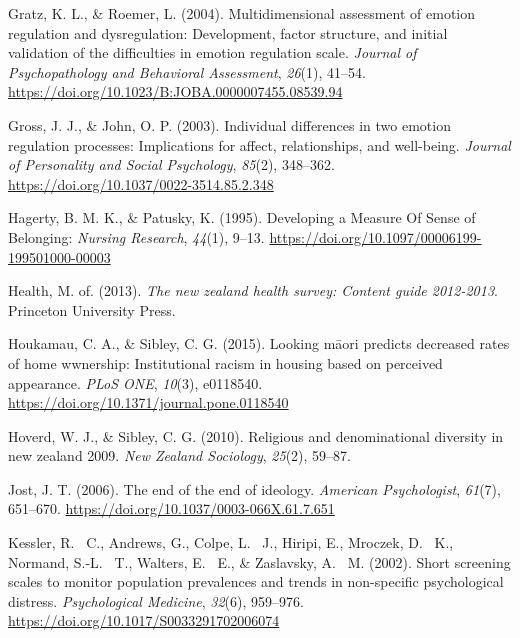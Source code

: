 \documentclass[
  letterpaper,
  DIV=11,
  numbers=noendperiod]{scrartcl}
\newlength{\cslhangindent}
\newlength{\cslentryspacingunit} %
\newenvironment{CSLReferences}[2] %
 {%
  \setlength{\parindent}{0pt}
  \ifodd #1
  \let\oldpar\par
  \def\par{\hangindent=\cslhangindent\oldpar}
  \fi
  \setlength{\parskip}{#2\cslentryspacingunit}
 }%
 {}
\begin{document}
\begin{CSLReferences}{1}{0}
\leavevmode{}%
Gratz, K. L., \& Roemer, L. (2004). Multidimensional assessment of
emotion regulation and dysregulation: Development, factor structure, and
initial validation of the difficulties in emotion regulation scale.
\emph{Journal of Psychopathology and Behavioral Assessment},
\emph{26}(1), 41--54.
\url{https://doi.org/10.1023/B:JOBA.0000007455.08539.94}

\leavevmode{}%
Gross, J. J., \& John, O. P. (2003). Individual differences in two
emotion regulation processes: Implications for affect, relationships,
and well-being. \emph{Journal of Personality and Social Psychology},
\emph{85}(2), 348--362. \url{https://doi.org/10.1037/0022-3514.85.2.348}

\leavevmode{}%
Hagerty, B. M. K., \& Patusky, K. (1995). Developing a Measure Of Sense
of Belonging: \emph{Nursing Research}, \emph{44}(1), 9--13.
\url{https://doi.org/10.1097/00006199-199501000-00003}

\leavevmode{}%
Health, M. of. (2013). \emph{The new zealand health survey: Content
guide 2012-2013}. Princeton University Press.

\leavevmode{}%
Houkamau, C. A., \& Sibley, C. G. (2015). Looking māori predicts
decreased rates of home wwnership: Institutional racism in housing based
on perceived appearance. \emph{{PLoS} {ONE}}, \emph{10}(3), e0118540.
\url{https://doi.org/10.1371/journal.pone.0118540}

\leavevmode{}%
Hoverd, W. J., \& Sibley, C. G. (2010). Religious and denominational
diversity in new zealand 2009. \emph{New Zealand Sociology},
\emph{25}(2), 59--87.

\leavevmode{}%
Jost, J. T. (2006). The end of the end of ideology. \emph{American
Psychologist}, \emph{61}(7), 651--670.
\url{https://doi.org/10.1037/0003-066X.61.7.651}

\leavevmode{}%
Kessler, R. ~C., Andrews, G., Colpe, L. ~J., Hiripi, E., Mroczek, D.
~K., Normand, S.-L. ~T., Walters, E. ~E., \& Zaslavsky, A. ~M. (2002).
Short screening scales to monitor population prevalences and trends in
non-specific psychological distress. \emph{Psychological Medicine},
\emph{32}(6), 959--976. \url{https://doi.org/10.1017/S0033291702006074}


\end{CSLReferences}
\end{document}
